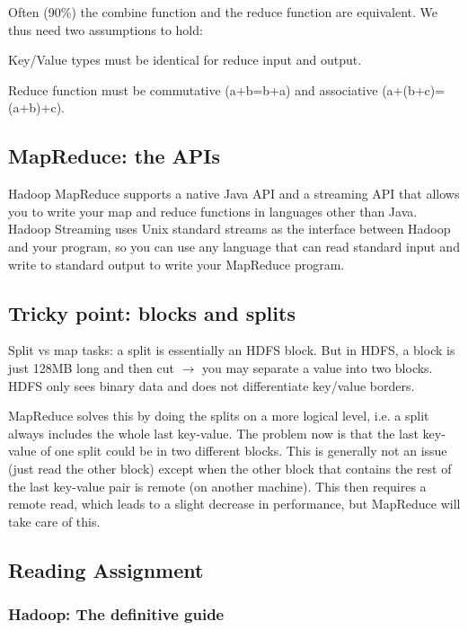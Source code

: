 \documentclass[11pt,oneside,a4paper]{article}
\begin{document}
Often (90\%) the combine function and the reduce function are equivalent. We thus need two assumptions to hold:

\begin{compactitem}
\item Key/Value types must be identical for reduce input and output.
\item Reduce function must be commutative (a+b=b+a) and associative (a+(b+c)=(a+b)+c).
\end{compactitem}


\subsection{MapReduce: the APIs}

Hadoop MapReduce supports a native Java API and a streaming API that allows you to write your map and reduce functions in languages other than Java. Hadoop Streaming uses Unix standard streams as the interface between Hadoop and your program, so you can use any language that can read standard input and write to standard output to write your MapReduce program.


\subsection{Tricky point: blocks and splits}

Split vs map tasks: a split is essentially an HDFS block. But in HDFS, a block is just 128MB long and then cut $\rightarrow$ you may separate a value into two blocks. HDFS only sees binary data and does not differentiate key/value borders.

MapReduce solves this by doing the splits on a more logical level, i.e. a split always includes the whole last key-value. The problem now is that the last key-value of one split could be in two different blocks. This is generally not an issue (just read the other block) except when the other block that contains the rest of the last key-value pair is remote (on another machine). This then requires a remote read, which leads to a slight decrease in performance, but MapReduce will take care of this.

\subsection{Reading Assignment}

\subsubsection{Hadoop: The definitive guide}
\end{document}
